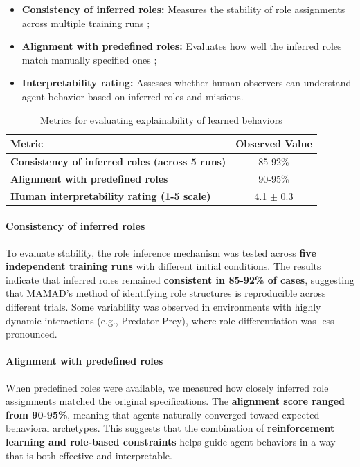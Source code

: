 \documentclass[journal]{IEEEtai}
\begin{document}
\begin{itemize}
    \item \textbf{Consistency of inferred roles:} Measures the stability of role assignments across multiple training runs ;
    \item \textbf{Alignment with predefined roles:} Evaluates how well the inferred roles match manually specified ones ;
    \item \textbf{Interpretability rating:} Assesses whether human observers can understand agent behavior based on inferred roles and missions.
\end{itemize}

\begin{table}[h!]
    \centering
    \caption{Metrics for evaluating explainability of learned behaviors}
    \begin{tabular}{|l|c|}
        \hline
        \textbf{Metric} & \textbf{Observed Value} \\
        \hline
        \textbf{Consistency of inferred roles (across 5 runs)} & 85-92\% \\
        \hline
        \textbf{Alignment with predefined roles} & 90-95\% \\
        \hline
        \textbf{Human interpretability rating (1-5 scale)} & 4.1 $\pm$ 0.3 \\
        \hline
    \end{tabular}
    \label{tab:explainability}
\end{table}

\paragraph{Consistency of inferred roles} 
To evaluate stability, the role inference mechanism was tested across \textbf{five independent training runs} with different initial conditions. The results indicate that inferred roles remained \textbf{consistent in 85-92\% of cases}, suggesting that MAMAD’s method of identifying role structures is reproducible across different trials. Some variability was observed in environments with highly dynamic interactions (e.g., Predator-Prey), where role differentiation was less pronounced.

\paragraph{Alignment with predefined roles}
When predefined roles were available, we measured how closely inferred role assignments matched the original specifications. The \textbf{alignment score ranged from 90-95\%}, meaning that agents naturally converged toward expected behavioral archetypes. This suggests that the combination of \textbf{reinforcement learning and role-based constraints} helps guide agent behaviors in a way that is both effective and interpretable.
\end{document}
